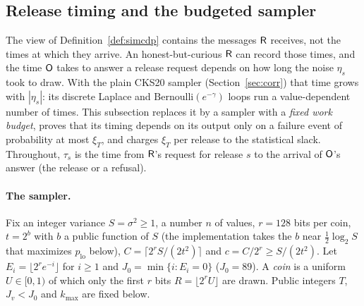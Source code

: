 \subsection{Release timing and the budgeted sampler}
\label{sec:timing}

The view of Definition~\ref{def:simcdp} contains the messages $\mathsf{R}$ receives, not the times at which they arrive. An honest-but-curious $\mathsf{R}$ can record those times, and the time $\mathsf{O}$ takes to answer a release request depends on how long the noise $\eta_s$ took to draw. With the plain CKS20 sampler (Section~\ref{sec:corr}) that time grows with $|\eta_s|$: its discrete Laplace and $\mathrm{Bernoulli}(e^{-\gamma})$ loops run a value-dependent number of times. This subsection replaces it by a sampler with a \emph{fixed work budget}, proves that its timing depends on its output only on a failure event of probability at most $\xi_T$, and charges $\xi_T$ per release to the statistical slack. Throughout, $\tau_s$ is the time from $\mathsf{R}$'s request for release $s$ to the arrival of $\mathsf{O}$'s answer (the release or a refusal).

\paragraph{The sampler.} Fix an integer variance $S=\sigma^2\ge1$, a number $n$ of values, $r=128$ bits per coin, $t=2^b$ with $b$ a public function of $S$ (the implementation takes the $b$ near $\tfrac12\log_2S$ that maximizes $p_{\mathrm{lo}}$ below), $C=\lceil2^rS/(2t^2)\rceil$ and $c=C/2^r\ge S/(2t^2)$. Let $E_i=\lfloor2^re^{-i}\rfloor$ for $i\ge1$ and $J_0=\min\{i:E_i=0\}$ ($J_0=89$). A \emph{coin} is a uniform $U\in[0,1)$ of which only the first $r$ bits $R=\lfloor2^rU\rfloor$ are drawn. Public integers $T$, $J_v<J_0$ and $k_{\max}$ are fixed below.

